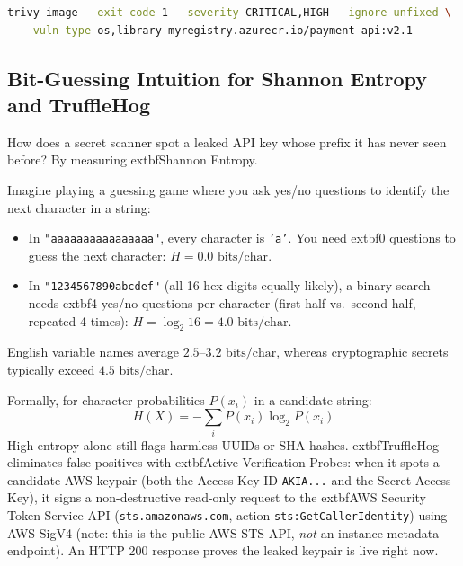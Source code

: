 \begin{lstlisting}[language=bash, caption={Trivy CI Container Gate Failing on Fixable High/Critical CVEs}]
trivy image --exit-code 1 --severity CRITICAL,HIGH --ignore-unfixed \
  --vuln-type os,library myregistry.azurecr.io/payment-api:v2.1
\end{lstlisting}

\subsection{Bit-Guessing Intuition for Shannon Entropy and TruffleHog}
How does a secret scanner spot a leaked API key whose prefix it has never seen before? By measuring 	extbf{Shannon Entropy}.

\begin{intuitionbox}
Imagine playing a guessing game where you ask yes/no questions to identify the next character in a string:
\begin{itemize}[leftmargin=12pt]
  \item In \texttt{"aaaaaaaaaaaaaaaa"}, every character is \texttt{'a'}. You need 	extbf{0 questions} to guess the next character: $H = 0.0\text{ bits/char}$.
  \item In \texttt{"1234567890abcdef"} (all 16 hex digits equally likely), a binary search needs 	extbf{4 yes/no questions} per character (first half vs.\ second half, repeated 4 times): $H = \log_2 16 = 4.0\text{ bits/char}$.
\end{itemize}
English variable names average $2.5$--$3.2\text{ bits/char}$, whereas cryptographic secrets typically exceed $4.5\text{ bits/char}$.
\end{intuitionbox}

Formally, for character probabilities $P(x_i)$ in a candidate string:
\begin{equation}
H(X) = -\sum_{i} P(x_i) \log_2 P(x_i)
\end{equation}
High entropy alone still flags harmless UUIDs or SHA hashes. 	extbf{TruffleHog} eliminates false positives with 	extbf{Active Verification Probes}: when it spots a candidate AWS keypair (both the Access Key ID \texttt{AKIA...} and the Secret Access Key), it signs a non-destructive read-only request to the 	extbf{AWS Security Token Service API (\texttt{sts.amazonaws.com}, action \texttt{sts:GetCallerIdentity})} using AWS SigV4 (note: this is the public AWS STS API, \emph{not} an instance metadata endpoint). An HTTP 200 response proves the leaked keypair is live right now.

